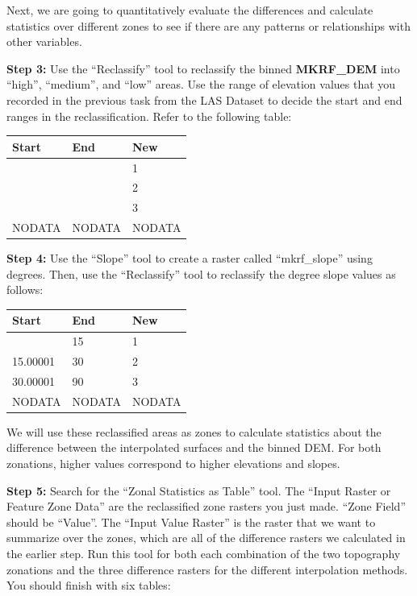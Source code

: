\documentclass[
]{book}
\begin{document}
Next, we are going to quantitatively evaluate the differences and calculate statistics over different zones to see if there are any patterns or relationships with other variables.

\textbf{Step 3:} Use the ``Reclassify'' tool to reclassify the binned \textbf{MKRF\_DEM} into ``high'', ``medium'', and ``low'' areas. Use the range of elevation values that you recorded in the previous task from the LAS Dataset to decide the start and end ranges in the reclassification. Refer to the following table:

\begin{longtable}[]{@{}lll@{}}
\toprule\noalign{}
Start & End & New \\
\midrule\noalign{}
\endhead
\bottomrule\noalign{}
\endlastfoot
& & 1 \\
& & 2 \\
& & 3 \\
NODATA & NODATA & NODATA \\
\end{longtable}

\textbf{Step 4:} Use the ``Slope'' tool to create a raster called ``mkrf\_slope'' using degrees. Then, use the ``Reclassify'' tool to reclassify the degree slope values as follows:

\begin{longtable}[]{@{}lll@{}}
\toprule\noalign{}
Start & End & New \\
\midrule\noalign{}
\endhead
\bottomrule\noalign{}
\endlastfoot
0 & 15 & 1 \\
15.00001 & 30 & 2 \\
30.00001 & 90 & 3 \\
NODATA & NODATA & NODATA \\
\end{longtable}

We will use these reclassified areas as zones to calculate statistics about the difference between the interpolated surfaces and the binned DEM. For both zonations, higher values correspond to higher elevations and slopes.

\textbf{Step 5:} Search for the ``Zonal Statistics as Table'' tool. The ``Input Raster or Feature Zone Data'' are the reclassified zone rasters you just made. ``Zone Field'' should be ``Value''. The ``Input Value Raster'' is the raster that we want to summarize over the zones, which are all of the difference rasters we calculated in the earlier step. Run this tool for both each combination of the two topography zonations and the three difference rasters for the different interpolation methods. You should finish with six tables:
\end{document}
